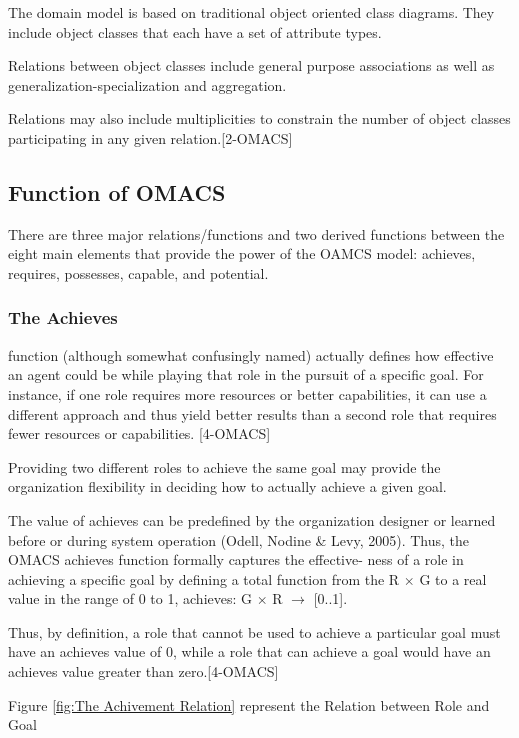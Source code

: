 The domain model is based on traditional object oriented class diagrams. They
include object classes that each have a set of attribute types. 

Relations between object classes include general purpose associations
 as well as generalization-specialization and aggregation.
 
Relations may also include multiplicities to constrain the number of object classes participating in
any given relation.[2-OMACS]
 






 
\subsection{ Function of OMACS }

There are three major relations/functions and two derived functions between the eight main elements that provide the power of the OAMCS model: achieves, requires, possesses, capable, and potential. 
\subsubsection{The Achieves}
function (although somewhat confusingly named) actually defines how effective an agent could be while playing that role in the pursuit of a specific goal. For instance, if one role requires more resources or better capabilities, it can use a different approach and thus yield better results than a second role that requires fewer resources or capabilities. [4-OMACS]

 Providing two different roles to achieve the same goal  may provide the organization flexibility in deciding how to actually achieve a given goal.

 The value of achieves can be predefined by the organization designer or learned before or during system operation (Odell, Nodine \& Levy, 2005). Thus, the OMACS achieves function formally captures the effective- ness of a role in achieving a specific goal by defining a total function from the R $\times$ G to a real value in the range of 0 to 1, achieves: G $\times$ R $\rightarrow$ {[}0..1{]}.
 
  Thus, by definition, a role that cannot be used to achieve a particular goal must have an achieves value of 0, while a role that can achieve a goal would have an achieves value greater than zero.[4-OMACS]

Figure \ref{fig:The Achivement Relation} represent the Relation between Role and Goal 

